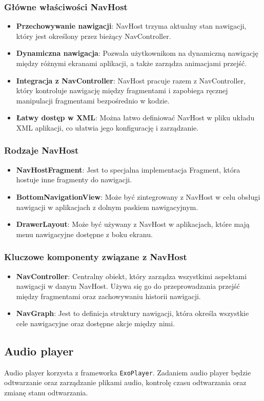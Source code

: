 \subsubsection{Główne właściwości NavHost}
\begin{itemize}
    \item \textbf{Przechowywanie nawigacji}: NavHost trzyma aktualny stan nawigacji, który jest określony przez bieżący NavController.
    \item \textbf{Dynamiczna nawigacja}: Pozwala użytkownikom na dynamiczną nawigację między różnymi ekranami aplikacji, a także zarządza animacjami przejść.
    \item \textbf{Integracja z NavController}: NavHost pracuje razem z NavController, który kontroluje nawigację między fragmentami i zapobiega ręcznej manipulacji fragmentami bezpośrednio w kodzie.
    \item \textbf{Łatwy dostęp w XML}: Można łatwo definiować NavHost w pliku układu XML aplikacji, co ułatwia jego konfigurację i zarządzanie.
\end{itemize}

\subsubsection{Rodzaje NavHost}
\begin{itemize}
    \item \textbf{NavHostFragment}: Jest to specjalna implementacja Fragment, która hostuje inne fragmenty do nawigacji.
    \item \textbf{BottomNavigationView}: Może być zintegrowany z NavHost w celu obsługi nawigacji w aplikacjach z dolnym paskiem nawigacyjnym.
    \item \textbf{DrawerLayout}: Może być używany z NavHost w aplikacjach, które mają menu nawigacyjne dostępne z boku ekranu.
\end{itemize}

\subsubsection{Kluczowe komponenty związane z NavHost}
\begin{itemize}
    \item \textbf{NavController}: Centralny obiekt, który zarządza wszystkimi aspektami nawigacji w danym NavHost. Używa się go do przeprowadzania przejść między fragmentami oraz zachowywaniu historii nawigacji.
    \item \textbf{NavGraph}: Jest to definicja struktury nawigacji, która określa wszystkie cele nawigacyjne oraz dostępne akcje między nimi.
\end{itemize}

\subsection{Audio player}
Audio player korzysta z frameworka \texttt{ExoPlayer}. Zadaniem audio player będzie odtwarzanie oraz zarządzanie plikami audio, kontrolę czasu odtwarzania oraz zmianę stanu odtwarzania.
